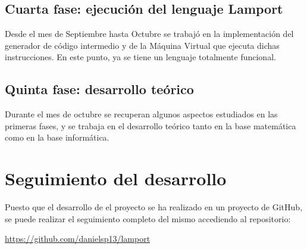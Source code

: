 \subsection{Cuarta fase: ejecución del lenguaje Lamport}
Desde el mes de Septiembre hasta Octubre se trabajó en la implementación del generador de código intermedio y de la Máquina Virtual que ejecuta dichas instrucciones. En este punto, ya se tiene un lenguaje totalmente funcional.

\subsection{Quinta fase: desarrollo teórico}
Durante el mes de octubre se recuperan algunos aspectos estudiados en las primeras fases, y se trabaja en el desarrollo teórico tanto en la base matemática como en la base informática.



\section{Seguimiento del desarrollo}
Puesto que el desarrollo de el proyecto se ha realizado en un proyecto de GitHub, se puede realizar el seguimiento completo del mismo accediendo al repositorio:

\begin{center}
    \href{https://github.com/danielsp13/lamport}{https://github.com/danielsp13/lamport}

\end{center}